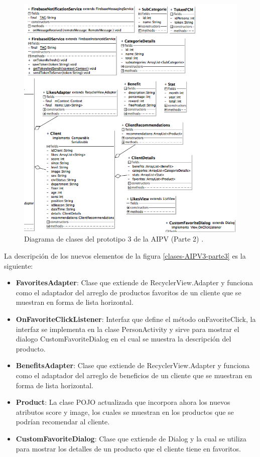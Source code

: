 \FloatBarrier
\begin{figure}[htbp!]
		\centering
			\includegraphics[width=.8 \textwidth]{imagenes/adrian/vendedor/prototipo3/clases_2}
		\caption{Diagrama de clases del prototipo 3 de la AIPV (Parte 2) .}
		\label{clases-AIPV3-parte2}
\end{figure}
\FloatBarrier

La descripción de los nuevos elementos de la figura \ref{clases-AIPV3-parte3} es la siguiente: 

\begin{itemize}
\item \textbf{FavoritesAdapter}: Clase que extiende de RecyclerView.Adapter y funciona como el adaptador del arreglo de productos favoritos de un cliente que se muestran en forma de lista horizontal.
\item \textbf{OnFavoriteClickListener}: Interfaz que define el método onFavoriteClick, la interfaz se implementa en la clase PersonActivity y sirve para mostrar el dialogo CustomFavoriteDialog en el cual se muestra la descripción del producto.
\item \textbf{BenefitsAdapter}:  Clase que extiende de RecyclerView.Adapter y funciona como el adaptador del arreglo de beneficios de un cliente que se muestran en forma de lista horizontal.
\item \textbf{Product}: La clase POJO actualizada que incorpora ahora los nuevos atributos score y image, los cuales se muestran en los productos que se podrían recomendar al cliente.
\item \textbf{CustomFavoriteDialog}: Clase que extiende de Dialog y la cual se utiliza para mostrar los detalles de un producto que el cliente tiene en favoritos. 
\end{itemize}

